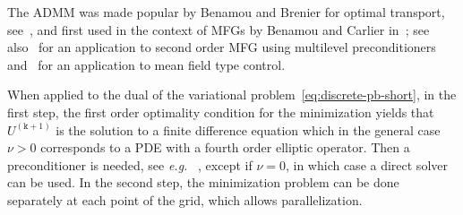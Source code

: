 \documentclass{amsproc}
\theoremstyle{definition}
\theoremstyle{remark}
\numberwithin{equation}{section}
\begin{document}
The ADMM was made popular  by Benamou and Brenier  for optimal transport,  see~\cite{MR1738163}, and  first used in the context of MFGs by Benamou and Carlier in~\cite{MR3395203}; see also~\cite{MR3731033} for an application to second order MFG using multilevel preconditioners and~\cite{MR3575615} for an application to mean field type control.

When applied to the dual of the variational problem~\eqref{eq:discrete-pb-short}, in the first step, the first order optimality condition for the minimization yields that $U^{(\mathtt{k}+1)}$ is the solution to a finite difference equation which in the general case $\nu>0$ corresponds to a PDE with a fourth order elliptic operator. Then a preconditioner is needed, see \textit{e.g.} ~\cite{MR2928376,BricenoAriasetalCEMRACS2017}, except if $\nu=0$, in which case a direct solver can be used.  In the second step, the minimization problem can be done separately at each point of the grid, which allows parallelization.
\end{document}
